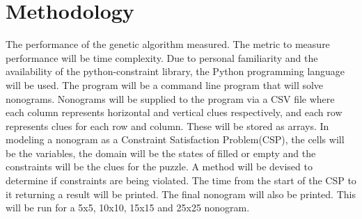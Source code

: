 \documentclass[12pt, letterpaper]{article}
\begin{document}
\section{Methodology}
The performance of the genetic algorithm measured. The metric to measure performance will be time complexity. Due to personal familiarity and the availability of the python-constraint \cite{pycon} library, the Python programming language will be used. The program will be a command line program that will solve nonograms. Nonograms will be supplied to the program via a CSV file where each column represents horizontal and vertical clues respectively, and each row represents clues for each row and column. These will be stored as arrays. 
In modeling a nonogram as a Constraint Satisfaction Problem(CSP), the cells will be the variables, the domain will be the states of filled or empty and the constraints will be the clues for the puzzle. A method will be devised to determine if constraints are being violated. The time from the start of the CSP to it returning a result will be printed. The final nonogram will also be printed. This will be run for a 5x5, 10x10, 15x15 and 25x25 nonogram.
\newpage


% 

% 




\end{document}
